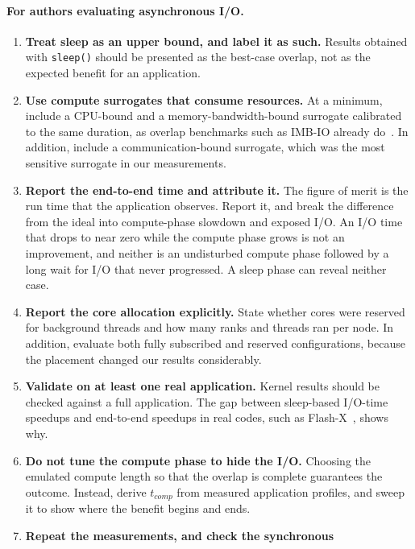 \paragraph{For authors evaluating asynchronous I/O.}
\begin{enumerate}
  \item \textbf{Treat sleep as an upper bound, and label it as such.} Results
        obtained with \texttt{sleep()} should be presented as the best-case
        overlap, not as the expected benefit for an application.
  \item \textbf{Use compute surrogates that consume resources.} At a minimum,
        include a CPU-bound and a memory-bandwidth-bound surrogate calibrated
        to the same duration, as overlap benchmarks such as IMB-IO already
        do~\cite{intel_imb_io}. In addition, include a communication-bound
        surrogate, which was the most sensitive surrogate in our
        measurements.
  \item \textbf{Report the end-to-end time and attribute it.} The figure of
        merit is the run time that the application observes. Report it, and
        break the difference from the ideal into compute-phase slowdown and
        exposed I/O. An I/O time that drops to near zero while the compute
        phase grows is not an improvement, and neither is an undisturbed
        compute phase followed by a long wait for I/O that never progressed.
        A sleep phase can reveal neither case.
  \item \textbf{Report the core allocation explicitly.} State whether cores
        were reserved for background threads and how many ranks and threads
        ran per node. In addition, evaluate both fully subscribed and
        reserved configurations, because the placement changed our results
        considerably.
  \item \textbf{Validate on at least one real application.} Kernel results
        should be checked against a full application. The gap between
        sleep-based I/O-time speedups and end-to-end speedups in real codes,
        such as Flash-X~\cite{jain2022flashx}, shows why.
  \item \textbf{Do not tune the compute phase to hide the I/O.} Choosing the
        emulated compute length so that the overlap is complete guarantees
        the outcome. Instead, derive $t_{comp}$ from measured application
        profiles, and sweep it to show where the benefit begins and ends.
  \item \textbf{Repeat the measurements, and check the synchronous
}
\end{enumerate}
